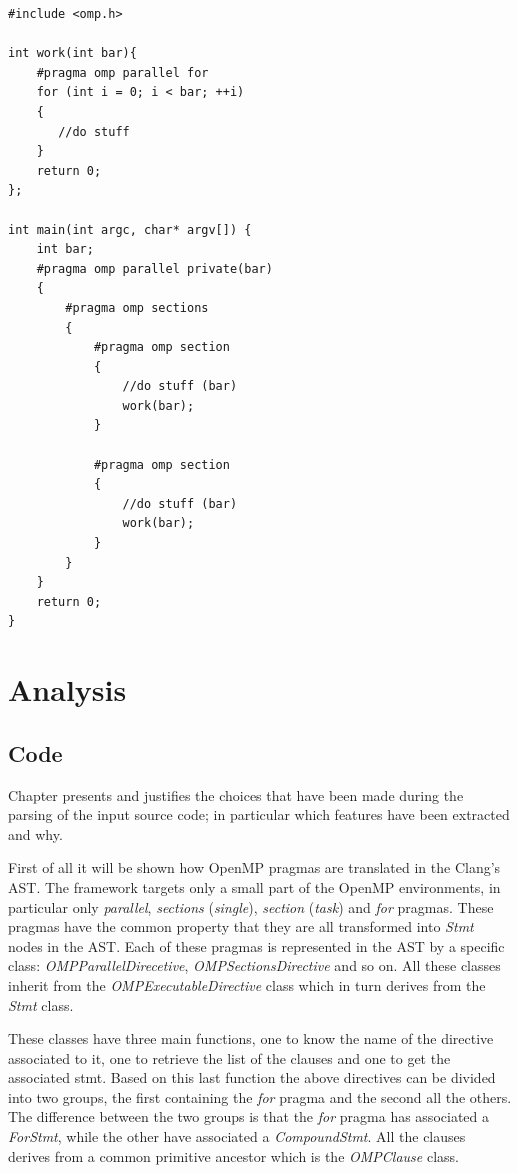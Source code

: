 \documentclass[a4paper,11pt,oneside]{book}
\begin{document}
\lstset{language=CCC}
\begin{lstlisting}[caption=Sample code, label=code]
#include <omp.h>

int work(int bar){
    #pragma omp parallel for
    for (int i = 0; i < bar; ++i)
    {
       //do stuff
    }  
    return 0;
};

int main(int argc, char* argv[]) {
    int bar;
    #pragma omp parallel private(bar)
    {
        #pragma omp sections
        {
            #pragma omp section
            {   
                //do stuff (bar)
                work(bar);
            }
            
            #pragma omp section
            {
                //do stuff (bar)
                work(bar);
            }
        }
    }
    return 0;
}

\end{lstlisting}


\section{Analysis}
\subsection{Code}

Chapter presents and justifies the choices that have been made during the parsing of the input source code; in particular which features have been extracted and why.

First of all it will be shown how OpenMP pragmas are translated in the Clang’s AST. The framework targets only a small part of the OpenMP environments, in particular only \emph{parallel}, \emph{sections} (\emph{single}), \emph{section} (\emph{task}) and \emph{for} pragmas. These pragmas have the common property that they are all transformed into \emph{Stmt} nodes in the AST. Each of these pragmas is represented in the AST by a specific class: \emph{OMPParallelDirecetive}, \emph{OMPSectionsDirective} and so on. All these classes inherit from the \emph{OMPExecutableDirective} class which in turn derives from the \emph{Stmt} class. 

These classes have three main functions, one to know the name of the directive associated to it, one to retrieve the list of the clauses and one to get the associated stmt. Based on this last function the above directives can be divided into two groups, the first containing the \emph{for} pragma and the second all the others. The difference between the two groups is that the \emph{for} pragma has associated a \emph{ForStmt}, while the other have associated a \emph{CompoundStmt}. All the clauses derives from a common primitive ancestor which is the \emph{OMPClause} class. 
\end{document}
